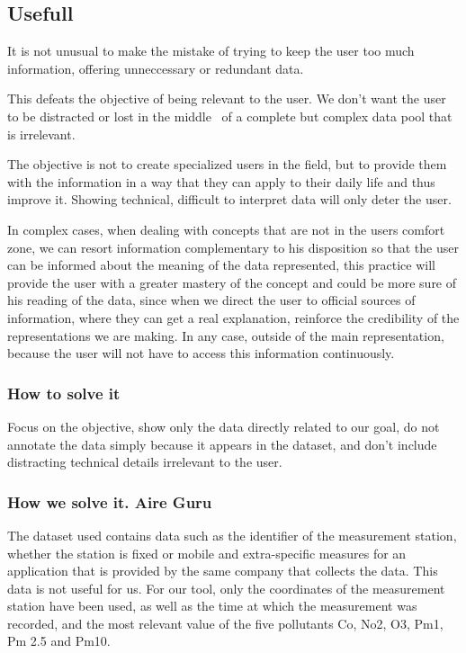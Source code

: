 \subsection{Usefull}
It is not unusual to make the mistake of trying to keep the user too much information, offering unneccessary or redundant data.
 
This defeats the objective of being relevant to the user. We don't want the user to be distracted or lost in the middle
 of a complete but complex data pool that is irrelevant.

The objective is not to create specialized users in the field, but to provide them with the
information in a way that they can apply to their daily life and thus improve it. Showing
technical, difficult to interpret data will only deter the user. 

In complex cases, when dealing with concepts that are not in the users comfort zone, we can resort information
complementary to his disposition so that the user can be informed about the meaning of the data
represented, this practice will provide the user with a greater mastery of the concept and could be more
sure of his reading of the data, since when we direct the user to official sources of information, where they can
get a real explanation, reinforce the credibility of the representations we are making. In any case,
outside of the main representation, because the user will not have to access this information continuously.

\subsubsection{How to solve it} 
Focus on the objective, show only the data directly related to our goal, do not annotate the data
simply because it appears in the dataset, and don't include distracting technical details irrelevant to the user.

\subsubsection{How we solve it. Aire Guru} 

The dataset used contains data such as the identifier of the measurement station, whether the station is fixed or mobile
and extra-specific measures for an application that is provided by the same company that collects the data. This data is not useful for us.
For our tool, only the coordinates of the measurement station have been used, as well as the time at which the measurement was recorded, and the most relevant value of the five pollutants Co, No2, O3, Pm1, Pm 2.5 and Pm10.

